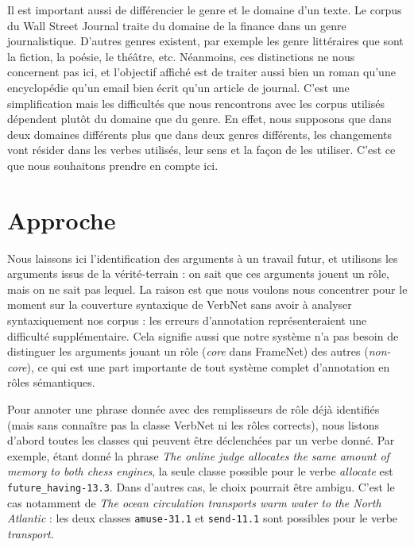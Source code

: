 
Il est important aussi de différencier le genre et le domaine d'un texte. Le
corpus du Wall Street Journal traite du domaine de la finance dans un genre
journalistique. D'autres genres existent, par exemple les genre littéraires que
sont la fiction, la poésie, le théâtre, etc. Néanmoins, ces distinctions ne
nous concernent pas ici, et l'objectif affiché est de traiter aussi bien un
roman qu'une encyclopédie qu'un email bien écrit qu'un article de journal.
C'est une simplification mais les difficultés que nous rencontrons avec les
corpus utilisés dépendent plutôt du domaine que du genre. En effet, nous
supposons que dans deux domaines différents plus que dans deux genres
différents, les changements vont résider dans les verbes utilisés, leur sens et
la façon de les utiliser. C'est ce que nous souhaitons prendre en compte ici.

\section{Approche}
\label{sec:domainsrl_approche}


Nous laissons ici l'identification des arguments à un travail futur, et
utilisons les arguments issus de la vérité-terrain : on sait que ces arguments
jouent un rôle, mais on ne sait pas lequel. La raison est que nous voulons nous
concentrer pour le moment sur la couverture syntaxique de VerbNet sans avoir à
analyser syntaxiquement nos corpus : les erreurs d'annotation représenteraient
une difficulté supplémentaire. Cela signifie aussi que notre système n'a pas
besoin de distinguer les arguments jouant un rôle (\textit{core} dans FrameNet)
des autres (\textit{non-core}), ce qui est une part importante de tout système
complet d'annotation en rôles sémantiques.

Pour annoter une phrase donnée avec des remplisseurs de rôle déjà identifiés
(mais sans connaître pas la classe VerbNet ni les rôles corrects), nous listons
d'abord toutes les classes qui peuvent être déclenchées par un verbe donné. Par
exemple, étant donné la phrase \textit{The online judge allocates the same amount
of memory to both chess engines}, la seule classe possible pour le verbe
\textit{allocate} est \texttt{future\_having-13.3}. Dans d'autres cas, le choix
pourrait être ambigu. C'est le cas notamment de \textit{The ocean circulation
transports warm water to the North Atlantic} : les deux classes
\texttt{amuse-31.1} et \texttt{send-11.1} sont possibles pour le verbe
\textit{transport}.

